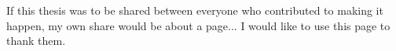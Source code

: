 
\begin{acknowledgements}      

If this thesis was to be shared between everyone who contributed to making it happen, my own share would be about a page... I would like to use this page to thank them.


\end{acknowledgements}
